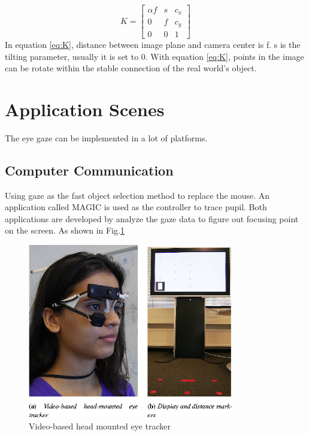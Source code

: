 \documentclass[senior]{IPSstyle}
\begin{document}
\begin{equation}\label{eq:K}
    K=\begin{bmatrix} \alpha f& s & c_x\\ 0 & f & c_y\\ 0 & 0 & 1 \end{bmatrix}
\end{equation}
In equation \ref{eq:K}, distance between image plane and camera center is f.
s is the tilting parameter, usually it is set to 0.
With equation \ref{eq:K}, points in the image can be rotate within the stable connection of the real world's object.


\section{Application Scenes}
The eye gaze can be implemented in a lot of platforms.

\subsection{Computer Communication}
Using gaze as the fast object selection method to replace the mouse.\cite{Sibert:2000:EEG:332040.332445}
An application called MAGIC is used as the controller to trace pupil.\cite{Zhai:1999:MGI:302979.303053}
Both applications are developed by analyze the gaze data to figure out focusing point on the screen.
As shown in Fig.\ref{fig:eye_tracker}
\begin{figure}
    \centering
    \includegraphics[width=9cm]{MasterThesis-master/images/eye_tracker.png}
    \caption{Video-based head mounted eye tracker}
    \label{fig:eye_tracker}
\end{figure}
\end{document}
